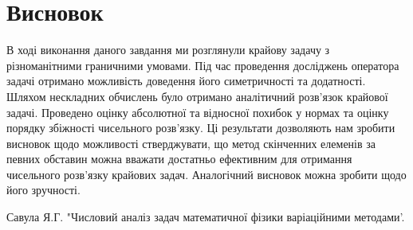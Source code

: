 \documentclass[12pt,a4paper, twoside]{article}
\begin{document}
\clearpage
\section*{Висновок}
{

В ході виконання даного завдання ми розглянули крайову задачу з різноманітними граничними умовами. Під час проведення досліджень оператора задачі отримано можливість доведення його симетричності та додатності. Шляхом нескладних обчислень було отримано аналітичний розв'язок крайової задачі. Проведено оцінку абсолютної та відносної похибок у нормах та оцінку порядку збіжності чисельного розв'язку.
Ці результати дозволяють нам зробити висновок щодо можливості стверджувати, що метод скінченних елеменів за певних обставин можна вважати достатньо ефективним для отримання чисельного розв'язку крайових задач. Аналогічний висновок можна зробити щодо його зручності.
}

\clearpage
{}
\begin{thebibliography}{3}
Савула Я.Г. "Числовий аналіз задач математичної фізики варіаційними
методами'.
\end{thebibliography}
\end{document}
